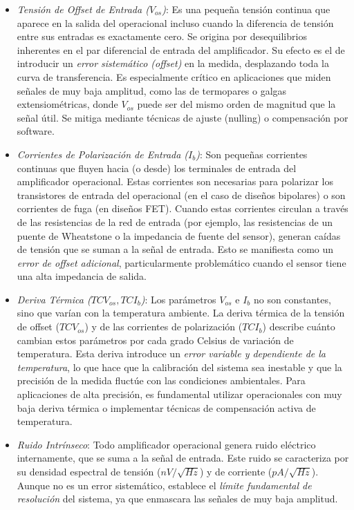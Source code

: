 \begin{itemize}
    \item \emph{Tensión de Offset de Entrada ($V_{os}$)}: Es una pequeña tensión continua que aparece en la salida del operacional incluso cuando la diferencia de tensión entre sus entradas es exactamente cero. Se origina por desequilibrios inherentes en el par diferencial de entrada del amplificador. Su efecto es el de introducir un \emph{error sistemático (offset)} en la medida, desplazando toda la curva de transferencia. Es especialmente crítico en aplicaciones que miden señales de muy baja amplitud, como las de termopares o galgas extensiométricas, donde $V_{os}$ puede ser del mismo orden de magnitud que la señal útil. Se mitiga mediante técnicas de ajuste (nulling) o compensación por software.

    \item \emph{Corrientes de Polarización de Entrada ($I_b$)}: Son pequeñas corrientes continuas que fluyen hacia (o desde) los terminales de entrada del amplificador operacional. Estas corrientes son necesarias para polarizar los transistores de entrada del operacional (en el caso de diseños bipolares) o son corrientes de fuga (en diseños FET). Cuando estas corrientes circulan a través de las resistencias de la red de entrada (por ejemplo, las resistencias de un puente de Wheatstone o la impedancia de fuente del sensor), generan caídas de tensión que se suman a la señal de entrada. Esto se manifiesta como un \emph{error de offset adicional}, particularmente problemático cuando el sensor tiene una alta impedancia de salida.

    \item \emph{Deriva Térmica ($TCV_{os}, TCI_b$)}: Los parámetros $V_{os}$ e $I_b$ no son constantes, sino que varían con la temperatura ambiente. La deriva térmica de la tensión de offset ($TCV_{os}$) y de las corrientes de polarización ($TCI_b$) describe cuánto cambian estos parámetros por cada grado Celsius de variación de temperatura. Esta deriva introduce un \emph{error variable y dependiente de la temperatura}, lo que hace que la calibración del sistema sea inestable y que la precisión de la medida fluctúe con las condiciones ambientales. Para aplicaciones de alta precisión, es fundamental utilizar operacionales con muy baja deriva térmica o implementar técnicas de compensación activa de temperatura.

    \item \emph{Ruido Intrínseco}: Todo amplificador operacional genera ruido eléctrico internamente, que se suma a la señal de entrada. Este ruido se caracteriza por su densidad espectral de tensión ($nV/\sqrt{Hz}$) y de corriente ($pA/\sqrt{Hz}$). Aunque no es un error sistemático, establece el \emph{límite fundamental de resolución} del sistema, ya que enmascara las señales de muy baja amplitud.


\end{itemize}
